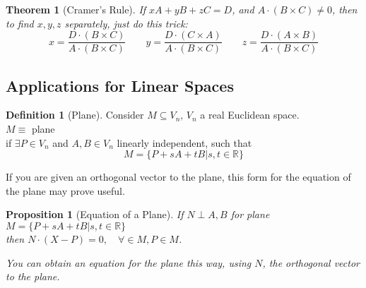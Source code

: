 \documentclass[twoside]{amsart}
\theoremstyle{plain}
\newtheorem{theorem}{Theorem}
\newtheorem{proposition}{Proposition}
\theoremstyle{definition}
\newtheorem{definition}{Definition}
\begin{document}
\begin{theorem}[Cramer's Rule]
If $xA + yB + zC = D$, and $A\cdot (B\times C) \neq 0$, then to find $x,y,z$ separately, just do this trick:
\[
x = \frac{ D \cdot (B\times C) }{ A \cdot (B\times C) } \quad \quad y = \frac{ D \cdot ( C \times A) }{ A \cdot (B\times C) } \quad \quad z = \frac{ D \cdot (A\times B)}{ A\cdot (B\times C) }
\]
\end{theorem}


\subsection{Applications for Linear Spaces}\label{subS:Linear_Spaces_Applications}
\begin{definition}[Plane]\label{D:Plane}
  Consider $M \subseteq V_n, \, V_n$ a real Euclidean space. \\
$M \equiv $ plane \\
  \phantom{M} if $\exists P \in V_n$ and $A, B \in V_n$ linearly independent, such that 
  \begin{equation}\label{E:Plane_Definition}
    M = \{ P + sA +tB | s,t \in \mathbb{R} \}
  \end{equation}
\end{definition}

If you are given an orthogonal vector to the plane, this form for the equation of the plane may prove useful.  

\begin{proposition}[Equation of a Plane]\label{Pr:Equation_form_Plane} 
  If $N \perp A,B$ for plane $M = \{ P + sA+tB |s,t \in \mathbb{R} \}$ \\
  \phantom{If} then $N \cdot (X-P) = 0, \quad \forall \in M, P \in M$.  
  
  You can obtain an equation for the plane this way, using $N$, the orthogonal vector to the plane.  
\end{proposition}
\end{document}
